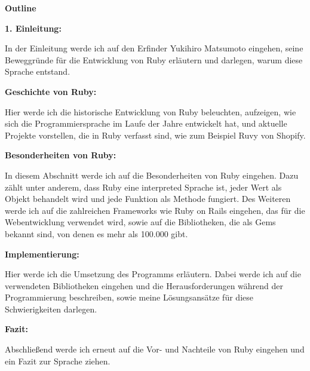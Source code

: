 \documentclass[titlepage]{article}
\begin{document}
\textbf
{Outline}

\textbf{1. Einleitung:}

In der Einleitung werde ich auf den Erfinder Yukihiro Matsumoto eingehen, seine Beweggründe für die Entwicklung von Ruby erläutern und darlegen, warum diese Sprache entstand.

\textbf{Geschichte von Ruby:}

Hier werde ich die historische Entwicklung von Ruby beleuchten, aufzeigen, wie sich die Programmiersprache im Laufe der Jahre entwickelt hat, und aktuelle Projekte vorstellen, die in Ruby verfasst sind, wie zum Beispiel Ruvy von Shopify.

\textbf{Besonderheiten von Ruby:}

In diesem Abschnitt werde ich auf die Besonderheiten von Ruby eingehen. Dazu zählt unter anderem, dass Ruby eine interpreted Sprache ist, jeder Wert als Objekt behandelt wird und jede Funktion als Methode fungiert. Des Weiteren werde ich auf die zahlreichen Frameworks wie Ruby on Rails eingehen, das für die Webentwicklung verwendet wird, sowie auf die Bibliotheken, die als Gems bekannt sind, von denen es mehr als 100.000 gibt.

\textbf{Implementierung:}

Hier werde ich die Umsetzung des Programms erläutern. Dabei werde ich auf die verwendeten Bibliotheken eingehen und die Herausforderungen während der Programmierung beschreiben, sowie meine Lösungsansätze für diese Schwierigkeiten darlegen.

\textbf{Fazit:}

Abschließend werde ich erneut auf die Vor- und Nachteile von Ruby eingehen und ein Fazit zur Sprache ziehen.
\end{document}
